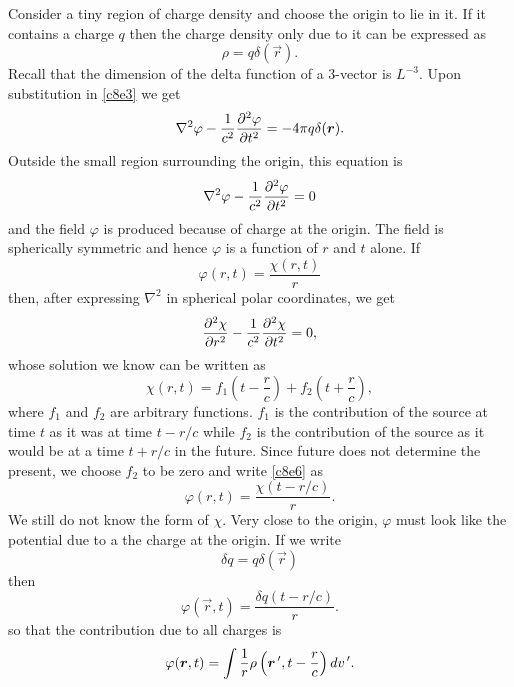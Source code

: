 \begin{enumerate}
Consider a tiny region of charge density and choose the origin to lie in it. If
it contains a charge $q$ then the charge density only due to it can be expressed
as 
\begin{equation}\label{c8e5}
\rho = q\delta(\vec{r}).
\end{equation}
Recall that the dimension of the delta function of a 3-vector is $L^{-3}$. Upon
substitution in \eqref{c8e3} we get
\[
\nabla^2\varphi - \frac{1}{c^2}\frac{\partial^2{\varphi}}{\partial{t}^2} = -4\pi q\delta(\bm{r}).
\]
Outside the small region surrounding the origin, this equation is 
\[
\nabla^2\varphi - \frac{1}{c^2}\frac{\partial^2{\varphi}}{\partial{t}^2} = 0
\]
and the field $\varphi$ is produced because of charge at the origin. The field 
is spherically symmetric and hence $\varphi$ is a function of $r$ and $t$ alone. 
If
\begin{equation}\label{c8e6}
\varphi(r, t) = \frac{\chi(r, t)}{r}
\end{equation}
then, after expressing $\nabla^2$ in spherical polar coordinates, we get
\begin{equation}\label{c8e7}
\frac{\partial^2{\chi}}{\partial{r}^2} - \frac{1}{c^2}\frac{\partial^2{\chi}}{\partial{t}^2} = 0,
\end{equation}
whose solution we know can be written as
\begin{equation}\label{c8e8}
\chi(r, t) = f_1\left(t - \frac{r}{c}\right) + f_2\left(t + \frac{r}{c}\right),
\end{equation}
where $f_1$ and $f_2$ are arbitrary functions. $f_1$ is the contribution of the
source at time $t$ as it was at time $t - r/c$ while $f_2$ is the contribution
of the source as it would be at a time $t + r/c$ in the future. Since future 
does not determine the present, we choose $f_2$ to be zero and write 
\eqref{c8e6} as 
\begin{equation}\label{c8e9}
\varphi(r, t) = \frac{\chi(t - r/c)}{r}.
\end{equation}
We still do not know the form of $\chi$. Very close to the origin, $\varphi$ 
must look like the potential due to a the charge at the origin. If we write 
\begin{equation}\label{c8e10}
\delta q = q\delta(\vec{r})
\end{equation}
then
\begin{equation}\label{c8e11}
\varphi(\vec{r}, t) = \frac{\delta q (t - r/c)}{r}.
\end{equation}
so that the contribution due to all charges is
\begin{equation}\label{c8e12}
\varphi(\vec{r}, t)=
\int \frac{1}{r}\rho\left(\vec{r}^\op, t - \frac{r}{c}\right)dv^\op.

\end{equation}
\end{enumerate}
